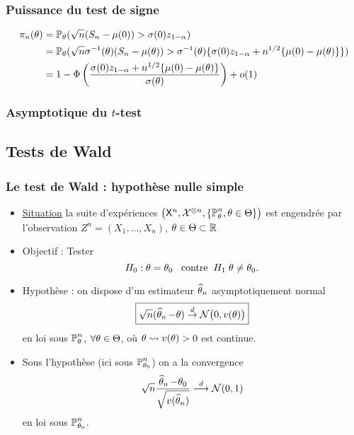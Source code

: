\begin{frame}
\frametitle{Puissance du test de signe}
\begin{align*}
\pi_n(\theta) 
&= \operatorname{{\mathbb P}}_\theta( \sqrt{n}(S_n - \mu(0)) > \sigma(0) z_{1-\alpha}) \\
&= \operatorname{{\mathbb P}}_\theta( \sqrt{n} \sigma^{-1}(\theta) (S_n - \mu(\theta)) > \sigma^{-1}(\theta) \{ \sigma(0) z_{1-\alpha} + n^{1/2} \{\mu(0)-\mu(\theta)\}\}) \\
&= 1 - \Phi\left( \frac{\sigma(0) z_{1-\alpha} + n^{1/2} \{ \mu(0) - \mu(\theta)\}}{\sigma(\theta)} \right) + o(1)
\end{align*}
\end{frame}

\begin{frame}
\frametitle{Asymptotique du $t$-test}

\end{frame}


\subsection{Tests de Wald}
\begin{frame}
\frametitle{Le test de Wald : hypothèse nulle simple}
\begin{itemize}
\item \underline{Situation} la suite d'expériences $\big(\mathsf{X}^n, \mathcal{X}^{\otimes n},\{\operatorname{{\mathbb P}}_\theta^n,\theta \in \Theta\}\big)$ est engendrée par l'observation $Z^n= (X_1,\dots,X_n)$, $\theta \in \Theta \subset \operatorname{{\mathbb R}}$
\item \alert{Objectif} : Tester
$$H_0:\theta = \theta_0\;\;\;\text{contre}\;\;H_1 \;\theta\neq \theta_0.$$
\item \alert{Hypothèse} : on dispose d'un estimateur $\operatorname{\widehat \theta_{\mathnormal{n}}}$ \alert{asymptotiquement normal}
$$\boxed{\sqrt{n}(\operatorname{\widehat \theta_{\mathnormal{n}}}-\theta)\stackrel{d}{\rightarrow}{\mathcal N}\big(0,v(\theta)\big)}$$
en loi sous $\operatorname{{\mathbb P}}_{\theta}^n$, $\forall \theta \in \Theta$, où $\theta \leadsto v(\theta) >0$ est continue.
\item Sous l'hypothèse (ici sous $\operatorname{{\mathbb P}}_{\theta_0}^n$) on a \alert{la convergence}
$$\sqrt{n}\frac{\operatorname{\widehat \theta_{\mathnormal{n}}}-\theta_0}{\sqrt{v(\operatorname{\widehat \theta_{\mathnormal{n}}})}}\stackrel{d}{\longrightarrow} {\mathcal N}(0,1)$$
\alert{en loi sous $\operatorname{{\mathbb P}}_{\theta_0}^n$}.
\end{itemize}
\end{frame}


